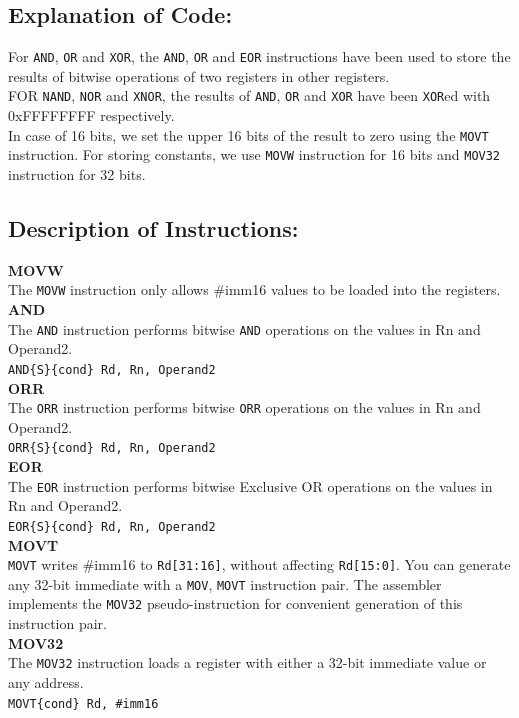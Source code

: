 \documentclass[12pt]{article}
\begin{document}
\subsection{Explanation of Code:}
For \verb|AND|, \verb|OR| and \verb|XOR|, the \verb|AND|, \verb|OR| and \verb|EOR| instructions have been used to store the results of bitwise operations of two registers in other registers. \\
FOR \verb|NAND|, \verb|NOR| and \verb|XNOR|, the results of \verb|AND|, \verb|OR| and \verb|XOR| have been \verb|XOR|ed with 0xFFFFFFFF respectively. \\
In case of 16 bits, we set the upper 16 bits of the result to zero using the \verb|MOVT| instruction. For storing constants, we use \verb|MOVW| instruction for 16 bits and \verb|MOV32| instruction for 32 bits.
\subsection{Description of Instructions:}
\textbf{MOVW}\\The \verb|MOVW| instruction only allows \#imm16 values to be loaded into the registers. \\
\textbf{AND}\\The \verb|AND| instruction performs bitwise \verb|AND| operations on the values in Rn and Operand2. \\
\verb|AND{S}{cond} Rd, Rn, Operand2|
\\
\textbf{ORR}\\The \verb|ORR| instruction performs bitwise \verb|ORR| operations on the values in Rn and Operand2.\\
\verb|ORR{S}{cond} Rd, Rn, Operand2|
\\
\textbf{EOR}\\The \verb|EOR| instruction performs bitwise Exclusive OR operations on the values in Rn and Operand2.\\
\verb|EOR{S}{cond} Rd, Rn, Operand2|
\\
\textbf{MOVT}\\ \verb|MOVT| writes \#imm16 to \verb|Rd[31:16]|, without affecting \verb|Rd[15:0]|. You can generate any 32-bit immediate with a \verb|MOV|, \verb|MOVT| instruction pair. The assembler implements the \verb|MOV32| pseudo-instruction for convenient generation of this instruction pair.\\
\textbf{MOV32} \\ The \verb|MOV32| instruction loads a register with either a 32-bit immediate value or any address.\\
\verb|MOVT{cond} Rd, #imm16|\\
\pagebreak
\end{document}
